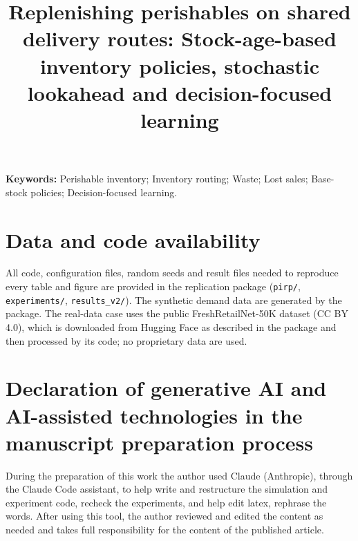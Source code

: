 \documentclass[11pt,a4paper]{article}
\title{Replenishing perishables on shared delivery routes: Stock-age-based inventory policies, stochastic lookahead and decision-focused learning}
\author{}
\date{}
\theoremstyle{definition}
\theoremstyle{remark}
\begin{document}
\maketitle

\begin{abstract}
\AbstractText
\end{abstract}

\textbf{Keywords:} Perishable inventory; Inventory routing; Waste; Lost sales; Base-stock policies; Decision-focused learning.

\newpage









\section*{Data and code availability}
All code, configuration files, random seeds and result files needed to reproduce every table and figure are provided in the replication package (\texttt{pirp/}, \texttt{experiments/}, \texttt{results\_v2/}). The synthetic demand data are generated by the package. The real-data case uses the public FreshRetailNet-50K dataset \citep{wang2025freshretailnet} (CC BY 4.0), which is downloaded from Hugging Face as described in the package and then processed by its code; no proprietary data are used.

\section*{Declaration of generative AI and AI-assisted technologies in the manuscript preparation process}
During the preparation of this work the author used Claude (Anthropic), through the Claude Code assistant, to help write and restructure the simulation and experiment code, recheck the experiments, and help edit latex, rephrase the words. After using this tool, the author reviewed and edited the content as needed and takes full responsibility for the content of the published article.

\FloatBarrier




\end{document}
